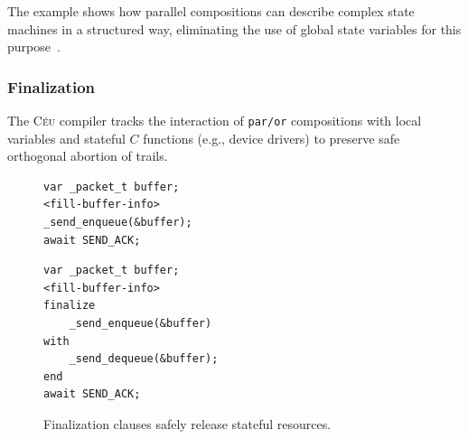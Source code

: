 \documentclass{acm_proc_article-sp}
\newcommand{\CEU}{\textsc{C\'{e}u}\xspace}
\newcommand{\code}[1] {{\small{\texttt{#1}}}}
\newcommand{\1}{\;}
\newcommand{\2}{\;\;}
\newcommand{\3}{\;\;\;}
\newcommand{\5}{\;\;\;\;\;}
\begin{document}
The example shows how parallel compositions can describe complex state machines 
in a structured way, eliminating the use of global state variables for this 
purpose~\cite{ceu.sensys13}.

\subsubsection{Finalization}

%
The \CEU compiler tracks the interaction of \code{par/or} compositions with 
local variables and stateful $C$ functions (e.g., device drivers) to preserve 
safe orthogonal abortion of trails.
%

\begin{figure}[t]
\begin{minipage}[t]{0.45\linewidth}
\begin{lstlisting}
var _packet_t buffer;
<fill-buffer-info>
_send_enqueue(&buffer);
await SEND_ACK;
\end{lstlisting}
\end{minipage}
%
\begin{minipage}[t]{0.50\linewidth}
\begin{lstlisting}
var _packet_t buffer;
<fill-buffer-info>
finalize
    _send_enqueue(&buffer)
with
    _send_dequeue(&buffer);
end
await SEND_ACK;
\end{lstlisting}
\end{minipage}
\caption{ Finalization clauses safely release stateful resources.
\label{lst.fin}
}
\end{figure}
\end{document}
